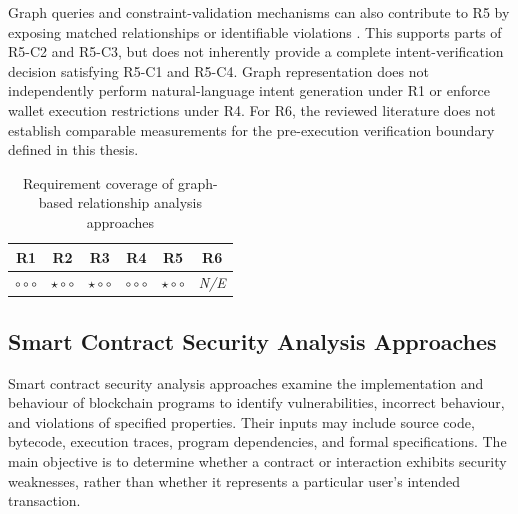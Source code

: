 Graph queries and constraint-validation mechanisms
can also contribute to R5 by exposing matched
relationships or identifiable violations
\cite{francisCypher2018,w3cSHACL2017}.
This supports parts of R5-C2 and R5-C3, but does not
inherently provide a complete intent-verification
decision satisfying R5-C1 and R5-C4. Graph representation does not independently perform
natural-language intent generation under R1 or enforce
wallet execution restrictions under R4. For R6,
the reviewed literature does not establish comparable
measurements for the pre-execution verification
boundary defined in this thesis.

\begin{table}[H]
\centering
\renewcommand{\arraystretch}{1.3}
\begin{tabular}{cccccc}
\hline
\textbf{R1} & \textbf{R2} & \textbf{R3} &
\textbf{R4} & \textbf{R5} & \textbf{R6} \\
\hline

$\circ\circ\circ$ &
$\star\circ\circ$ &
$\star\circ\circ$ &
$\circ\circ\circ$ &
$\star\circ\circ$ &
\textit{N/E} \\

\hline
\end{tabular}
\caption{Requirement coverage of graph-based
relationship analysis approaches}
\label{tab:req_graph_structured}
\end{table}



\subsection{Smart Contract Security Analysis Approaches}
\label{subsec:smart_contract_security}

Smart contract security analysis approaches examine the
implementation and behaviour of blockchain programs to
identify vulnerabilities, incorrect behaviour, and violations
of specified properties. Their inputs may include source code,
bytecode, execution traces, program dependencies, and formal
specifications. The main objective is to determine whether
a contract or interaction exhibits security weaknesses,
rather than whether it represents a particular user's
intended transaction. 

